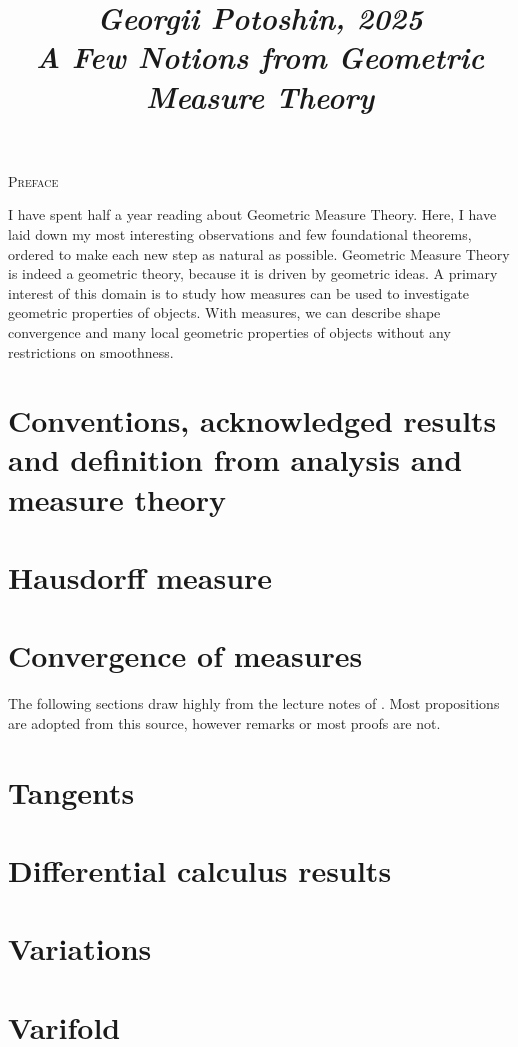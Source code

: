 \documentclass{article}
\begin{document}
\title{
\vspace{-1cm}
\textit{\small{Georgii Potoshin, 2025}}\\
\vspace{0.3ex}
\textit{\huge{A Few Notions from Geometric Measure Theory}}\vspace{1ex}
}
\date{\vspace{-5ex}}
\maketitle

\begin{center}\textsc{\Large{Preface}}\end{center}

I have spent half a year reading about Geometric Measure Theory. Here, I have
laid  down my most interesting observations and few foundational theorems,
ordered to make each new step as natural as possible.
Geometric Measure Theory is indeed a geometric theory, because it is
driven by geometric ideas. A primary interest of this domain is to study how
measures can be used to investigate geometric properties of objects. With measures,
we can describe shape convergence and many local geometric properties
of objects without any restrictions on smoothness.

\section{Conventions, acknowledged results and definition from analysis and measure theory}


\section{Hausdorff measure}


\section{Convergence of measures}


\vspace{1ex}
The following sections draw highly from the lecture notes of \cite{giovanni_alberti}.
Most propositions are adopted from this source, however remarks or most proofs
are not.

\section{Tangents}


\section{Differential calculus results}


\section{Variations}


\section{Varifold}


\medskip


\end{document}
